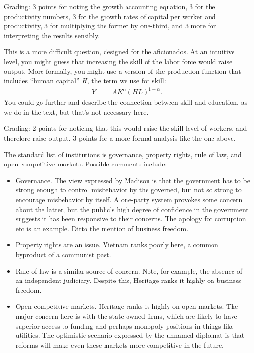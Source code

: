 \documentclass[letterpaper,12pt]{exam}
\begin{document}
\begin{questions}
\begin{solution}
\begin{parts}
Grading:  3 points for noting the growth accounting equation,
3 for the productivity numbers,
3 for the growth rates of capital per worker and productivity,
3 for multiplying the former by one-third,
and 3 more for interpreting the results sensibly.

\item This is a more difficult question, designed for the aficionados.
At an intuitive level, you might guess that increasing the skill of the labor force
would raise output.
More formally, you might use a version of the production
function that includes ``human capital'' $H$, the term we use for skill:
\begin{eqnarray*}
    Y &=& A K^\alpha (HL)^{1-\alpha} .
\end{eqnarray*}
You could go further and describe the connection between skill and education,
as we do in the text, but that's not necessary here.

Grading:  2 points for noticing that this would raise the skill level of workers,
and therefore raise output.
3 points for a more formal analysis like the one above.

\item The standard list of institutions is governance, property rights, rule of law,
and open competitive markets.
Possible comments include:
%
\begin{itemize}
\item Governance.
The view expressed by Madison is that the government has to be strong enough to
control misbehavior by the governed, but not so strong to encourage misbehavior by itself.
A one-party system provokes some concern about the latter, but the public's high degree
of confidence in the government suggests it has been responsive to their concerns.
The apology for corruption etc is an example.
Ditto the mention of business freedom.

\item Property rights are an issue.  Vietnam ranks poorly here,
a common byproduct of a communist past.

\item Rule of law is a similar source of concern.  Note, for example,
the absence of an independent judiciary.
Despite this, Heritage ranks it highly on business freedom.

\item Open competitive markets.
Heritage ranks it highly on open markets.
The major concern here is with the state-owned firms,
which are likely to have superior access to funding
and perhaps monopoly positions in things like utilities.
The optimistic scenario expressed by the unnamed diplomat
is that reforms will make even these markets
more competitive in the future.


\end{itemize}
\end{parts}
\end{solution}
\end{questions}
\end{document}

